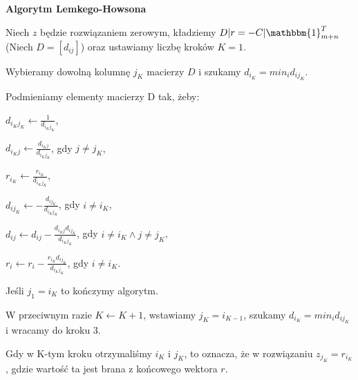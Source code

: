 \begin{definicja}
    \textbf{Algorytm Lemkego-Howsona}
    \begin{enumerate*}[label=\roman*)] 
        \item Niech $z$ będzie rozwiązaniem zerowym, kładziemy $D|r = -C|\mathbbm{1}_{m+n}^T$ (Niech $D = [d_{ij}]$) oraz ustawiamy liczbę kroków $K = 1$.
        \item Wybieramy dowolną kolumnę $j_K$ macierzy $D$ i szukamy $d_{i_K} = min_i d_{ij_K}$.
        \item Podmieniamy elementy macierzy D tak, żeby:
        \begin{enumerate*} 
            \item $d_{i_K j_K} \leftarrow \frac{1}{d_{i_K j_K}}$,
            \item $d_{i_K j} \leftarrow \frac{d_{i_K j}}{d_{i_K j_K}}$, gdy $j \neq j_K$,
            \item $r_{i_K} \leftarrow \frac{r_{i_K}}{d_{i_K j_K}}$,
            \item $d_{ij_K} \leftarrow - \frac{d_{ij_K}}{d_{i_K j_K}}$, gdy $i \neq i_K$,
            \item $d_{ij} \leftarrow d_{ij} - \frac{d_{i_K j} d_{ij_K}}{d_{i_K j_K}}$, gdy $i \neq i_K \land j \neq j_K$,
            \item $r_{i} \leftarrow r_i - \frac{r_{i_K} d_{ij_K}}{d_{i_K j_K}}$, gdy $i \neq i_K$.
        \end{enumerate*}
        \item Jeśli $j_1 = i_K$ to kończymy algorytm.
        \item W przeciwnym razie $K \leftarrow K + 1$, wstawiamy $j_K = i_{K-1}$, szukamy $d_{i_K} = min_i d_{ij_K}$ i wracamy do kroku 3.
    \end{enumerate*}
    Gdy w K-tym kroku otrzymaliśmy $i_K$ i $j_K$, to oznacza, że w rozwiązaniu $z_{j_K} = r_{i_K}$, gdzie wartość ta jest brana z końcowego wektora $r$.
\end{definicja} 
